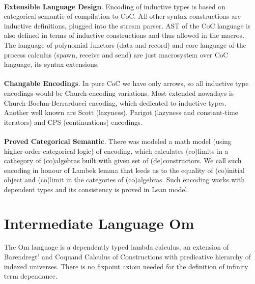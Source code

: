 \documentclass[11pt,oneside]{article}
\begin{document}
\paragraph{}
{\bf Extensible Language Design}. Encoding of inductive types is based on categorical
semantic of compilation to CoC. All other syntax constructions are inductive
definitions, plugged into the stream parser. AST of the CoC language is also
defined in terms of inductive constructions and thus allowed in the macros.
The language of polynomial functors (data and record) and core language of
the process calculus (spawn, receive and send) are just macrosystem over CoC language,
its syntax extensions.

\paragraph{}
{\bf Changable Encodings}. In pure CoC we have only arrows, so all inductive type encodings would
be Church-encoding variations. Most extended nowadays is Church-Boehm-Berrarducci encoding,
which dedicated to inductive types. Another well known are Scott (lazyness),
Parigot (lazyness and constant-time iterators) and CPS (continuations) encodings.

\paragraph{}
{\bf Proved Categorical Semantic}. There was modeled a math model (using
higher-order categorical logic) of encoding, which calculates (co)limits in a
cathegory of (co)algebras built with given set of (de)constructors.
We call such encoding in honour of Lambek lemma that leeds us to the
equality of (co)initial object and (co)limit in the categories of (co)algebras.
Such encoding works with dependent types and its consistency is proved in Lean model.

\newpage
\section{Intermediate Language Om}

   \paragraph{}
   The Om language is a dependently typed lambda calculus, an extension of Barendregt'
   and Coquand Calculus of Constructions with predicative hierarchy of indexed universes.
   There is no fixpoint axiom needed for the definition of infinity term dependance.
\end{document}

